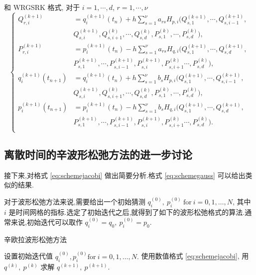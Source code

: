 和 WRGSRK 格式, 对于 $i=1,\cdots,d$, $r=1,\cdots,\nu$
\begin{equation*}
  \left\lbrace
    \begin{aligned}
      Q_{r,i}^{(k+1)}&=q_{i}^{(k+1)}(t_{n})+h\sum_{s=1}^{\nu}a_{rs}H_{p,i}(Q_{s,1}^{(k+1)},\cdots,Q_{s,i-1}^{(k+1)},\\
                            &Q_{s,i}^{(k+1)},Q_{s,i+1}^{(k)},\cdots,Q_{s,d}^{(k)},P_{s,1}^{(k)},\cdots,P_{s,d}^{(k)}),\\
      P_{r,i}^{(k+1)}&=p_{i}^{(k+1)}(t_{n})-h\sum_{s=1}^{\nu}a_{rs}H_{q,i}(Q_{s,1}^{(k+1)},\cdots,Q_{s,d}^{(k+1)},\\
                            &P_{s,1}^{(k+1)},\cdots,P_{s,i-1}^{(k+1)},P_{s,i}^{(k+1)},P_{s,i+1}^{(k)}\cdots,P_{s,d}^{(k)}),\\
      q_{i}^{(k+1)}(t_{n+1})&=q_{i}^{(k+1)}(t_{n})+h\sum_{s=1}^{\nu}b_{s}H_{p,i}(Q_{s,1}^{(k+1)},\cdots,Q_{s,i-1}^{(k+1)},\\
                            &Q_{s,i}^{(k+1)},Q_{s,i+1}^{(k)},\cdots,Q_{s,d}^{(k)},P_{s,1}^{(k)},\cdots,P_{s,d}^{(k)}),\\
      p_{i}^{(k+1)}(t_{n+1})&=p_{i}^{(k+1)}(t_{n})-h\sum_{s=1}^{\nu}b_{s}H_{q,i}(Q_{s,1}^{(k+1)},\cdots,Q_{s,d}^{(k+1)},\\
                            &P_{s,1}^{(k+1)},\cdots,P_{s,i-1}^{(k+1)},P_{s,i}^{(k+1)},P_{s,i+1}^{(k)}\cdots,P_{s,d}^{(k)}).\\
    \end{aligned}
  \right.
\end{equation*}

\subsection{离散时间的辛波形松弛方法的进一步讨论}
接下来,对格式 \eqref{eq:schemejacobi} 做出简要分析.格式 \eqref{eq:schemegauss} 可以给出类似的结果.

对于波形松弛方法来说,需要给出一个初始猜测 $q_{i}^{(0)},~p_{i}^{(0)}~\text{for}~i=0,1,\ldots,N$, 其中 $i$ 是时间网格的指标.选定了初始迭代之后,就得到了如下的波形松弛格式的算法.通常来说,初始迭代可以取作 $q_{i}^{(0)}=q_{0},~p_{i}^{(0)}=p_{0}.$

\begin{algorithm}
\caption{辛欧拉波形松弛方法}
\label{alg:alg1}
\begin{algorithmic}
    \STATE 设置初始迭代值 $q_{i}^{(0)}, p_{i}^{(0)} \text{for}~i=0,1,\ldots,N.$
        \STATE 使用数值格式 \eqref{eq:schemejacobi}, 用 $q^{(k)},~p^{(k)}$ 求解 $q^{(k+1)},~p^{(k+1)}$.
    \ENDWHILE
\end{algorithmic}
\end{algorithm}


